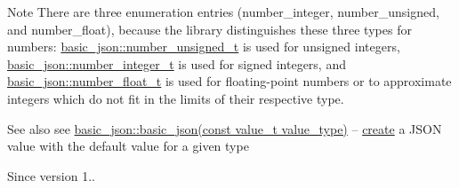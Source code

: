 \begin{DoxyNote}{Note}
There are three enumeration entries (number\+\_\+integer, number\+\_\+unsigned, and number\+\_\+float), because the library distinguishes these three types for numbers\+: \hyperlink{classnlohmann_1_1basic__json_ae09af9c23351b7245d9be4d1b2035fef}{basic\+\_\+json\+::number\+\_\+unsigned\+\_\+t} is used for unsigned integers, \hyperlink{classnlohmann_1_1basic__json_a11e390944da90db83089eb2426a749d3}{basic\+\_\+json\+::number\+\_\+integer\+\_\+t} is used for signed integers, and \hyperlink{classnlohmann_1_1basic__json_a5b8abaebd922d82d69756327c0c347e6}{basic\+\_\+json\+::number\+\_\+float\+\_\+t} is used for floating-\/point numbers or to approximate integers which do not fit in the limits of their respective type.
\end{DoxyNote}
\begin{DoxySeeAlso}{See also}
see \hyperlink{classnlohmann_1_1basic__json_a19734fbc9c97d536832892ddacd6b62a}{basic\+\_\+json\+::basic\+\_\+json(const value\+\_\+t value\+\_\+type)} -- \hyperlink{classSprite_a6b7ca689b01646e2c58a9ffae3683413}{create} a J\+S\+ON value with the default value for a given type
\end{DoxySeeAlso}
\begin{DoxySince}{Since}
version 1.. 
\end{DoxySince}
